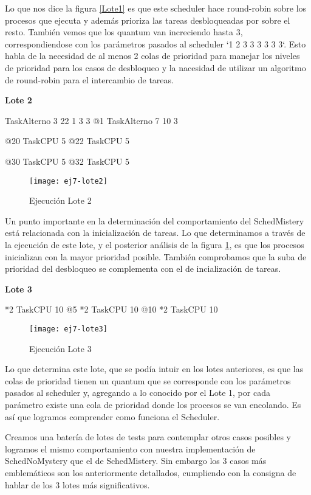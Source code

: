 Lo que nos dice la figura \ref{Lote1} es que este scheduler hace round-robin sobre los procesos que ejecuta y además prioriza las tareas desbloqueadas por sobre el resto. También vemos que los quantum van increciendo hasta 3, correspondiendose con los parámetros pasados al scheduler `1 2 3 3 3 3 3 3`. Esto habla de la necesidad de al menos 2 colas de prioridad para manejar los niveles de prioridad para los casos de desbloqueo y la nacesidad de utilizar un algoritmo de round-robin para el intercambio de tareas.

\bigskip

\textbf{Lote 2}

TaskAlterno 3 22 1 3 3
@1
TaskAlterno 7 10 3

@20
TaskCPU 5
@22
TaskCPU 5

@30
TaskCPU 5
@32
TaskCPU 5

\begin{figure}[h]
    \texttt{[image: ej7-lote2]}
    \caption{Ejecución Lote 2}
    \label{Lote2}
\end{figure}

Un punto importante en la determinación del comportamiento del SchedMistery está relacionada con la inicialización de tareas. Lo que determinamos a través de la ejecución de este lote, y el posterior análisis de la figura \ref{Lote2}, es que los procesos inicializan con la mayor prioridad posible. También comprobamos que la suba de prioridad del desbloqueo se complementa con el de incialización de tareas.

\bigskip

\textbf{Lote 3}

*2 TaskCPU 10
@5
*2 TaskCPU 10
@10
*2 TaskCPU 10

\begin{figure}[h]
    \texttt{[image: ej7-lote3]}
    \caption{Ejecución Lote 3}
    \label{Lote3}
\end{figure}

Lo que determina este lote, que se podía intuir en los lotes anteriores, es que las colas de prioridad tienen un quantum que se corresponde con los parámetros pasados al scheduler y, agregando a lo conocido por el Lote 1, por cada parámetro existe una cola de prioridad donde los procesos se van encolando. Es así que logramos comprender como funciona el Scheduler.

Creamos una batería de lotes de tests para contemplar otros casos posibles y logramos el mismo comportamiento con nuestra implementación de SchedNoMystery que el de SchedMistery. Sin embargo los 3 casos más emblemáticos son los anteriormente detallados, cumpliendo con la consigna de hablar de los 3 lotes más significativos.
